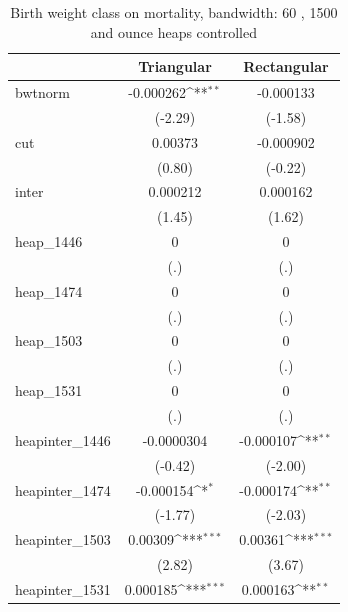 \documentclass[a4paper,11pt]{article}
\begin{document}

\begin{table}[htbp]\centering
\def\sym#1{\ifmmode^{#1}\else\(^{#1}\)\fi}
\caption{Birth weight class on mortality, bandwidth: 60 , 1500 and ounce heaps controlled}
\label{B4.bw60}
\begin{tabular}{l*{2}{c}}
\hline\hline
            &\multicolumn{1}{c}{Triangular}&\multicolumn{1}{c}{Rectangular}\\
\hline
bwtnorm     &   -0.000262\sym{**} &   -0.000133         \\
            &     (-2.29)         &     (-1.58)         \\
[1em]
cut         &     0.00373         &   -0.000902         \\
            &      (0.80)         &     (-0.22)         \\
[1em]
inter       &    0.000212         &    0.000162         \\
            &      (1.45)         &      (1.62)         \\
[1em]
heap\_1446   &           0         &           0         \\
            &         (.)         &         (.)         \\
[1em]
heap\_1474   &           0         &           0         \\
            &         (.)         &         (.)         \\
[1em]
heap\_1503   &           0         &           0         \\
            &         (.)         &         (.)         \\
[1em]
heap\_1531   &           0         &           0         \\
            &         (.)         &         (.)         \\
[1em]
heapinter\_1446&  -0.0000304         &   -0.000107\sym{**} \\
            &     (-0.42)         &     (-2.00)         \\
[1em]
heapinter\_1474&   -0.000154\sym{*}  &   -0.000174\sym{**} \\
            &     (-1.77)         &     (-2.03)         \\
[1em]
heapinter\_1503&     0.00309\sym{***}&     0.00361\sym{***}\\
            &      (2.82)         &      (3.67)         \\
[1em]
heapinter\_1531&    0.000185\sym{***}&    0.000163\sym{**} \\

\end{tabular}
\end{table}
\end{document}
